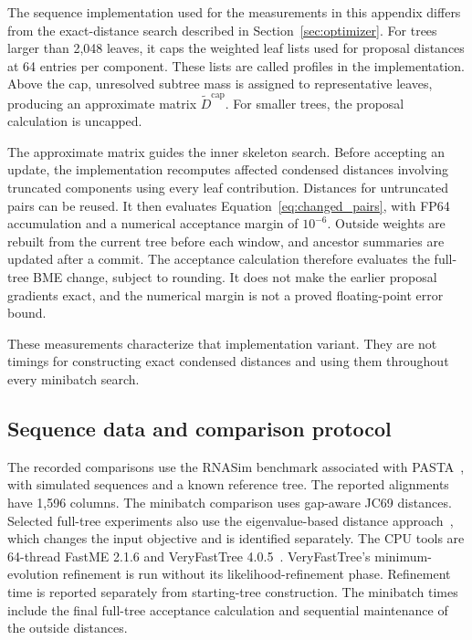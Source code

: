 The sequence implementation used for the measurements in this appendix differs from the exact-distance search described in Section~\ref{sec:optimizer}.
For trees larger than 2,048 leaves, it caps the weighted leaf lists used for proposal distances at 64 entries per component.
These lists are called profiles in the implementation.
Above the cap, unresolved subtree mass is assigned to representative leaves, producing an approximate matrix $\widetilde D^{\mathrm{cap}}$.
For smaller trees, the proposal calculation is uncapped.

The approximate matrix guides the inner skeleton search.
Before accepting an update, the implementation recomputes affected condensed distances involving truncated components using every leaf contribution.
Distances for untruncated pairs can be reused.
It then evaluates Equation~\eqref{eq:changed_pairs}, with FP64 accumulation and a numerical acceptance margin of $10^{-6}$.
Outside weights are rebuilt from the current tree before each window, and ancestor summaries are updated after a commit.
The acceptance calculation therefore evaluates the full-tree BME change, subject to rounding.
It does not make the earlier proposal gradients exact, and the numerical margin is not a proved floating-point error bound.

These measurements characterize that implementation variant.
They are not timings for constructing exact condensed distances and using them throughout every minibatch search.

\subsection{Sequence data and comparison protocol}

The recorded comparisons use the RNASim benchmark associated with PASTA~\cite{mirarab2015pasta}, with simulated sequences and a known reference tree.
The reported alignments have 1,596 columns.
The minibatch comparison uses gap-aware JC69 distances.
Selected full-tree experiments also use the eigenvalue-based distance approach~\cite{penn2025eigen}, which changes the input objective and is identified separately.
The CPU tools are 64-thread FastME 2.1.6 and VeryFastTree 4.0.5~\cite{lefort2015fastme,pineiro2020veryfasttree}.
VeryFastTree's minimum-evolution refinement is run without its likelihood-refinement phase.
Refinement time is reported separately from starting-tree construction.
The minibatch times include the final full-tree acceptance calculation and sequential maintenance of the outside distances.

